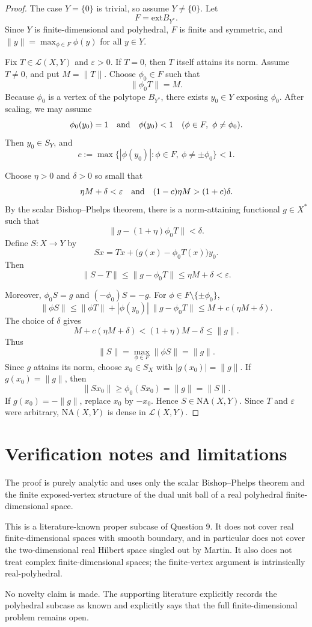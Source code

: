 \documentclass[11pt]{article}
\newcommand{\NA}{\mathrm{NA}}
\newcommand{\Lop}{\mathcal L}
\newcommand{\ext}{\mathrm{ext}}
\begin{document}
\begin{proof}
The case \(Y=\{0\}\) is trivial, so assume \(Y\ne \{0\}\).  Let
\[
  F=\ext B_{Y^*}.
\]
Since \(Y\) is finite-dimensional and polyhedral, \(F\) is finite and
symmetric, and \(\|y\|=\max_{\phi\in F}\phi(y)\) for all \(y\in Y\).

Fix \(T\in \Lop(X,Y)\) and \(\varepsilon>0\).  If \(T=0\), then \(T\) itself
attains its norm.  Assume \(T\ne 0\), and put \(M=\|T\|\).  Choose
\(\phi_0\in F\) such that
\[
  \|\phi_0 T\|=M.
\]
Because \(\phi_0\) is a vertex of the polytope \(B_{Y^*}\), there exists
\(y_0\in Y\) exposing \(\phi_0\).  After scaling, we may assume
\[
  \phi_0(y_0)=1
  \quad\hbox{and}\quad
  \phi(y_0)<1 \quad (\phi\in F,\ \phi\ne \phi_0).
\]
Then \(y_0\in S_Y\), and
\[
  c:=\max\{|\phi(y_0)|:\phi\in F,\ \phi\ne \pm\phi_0\}<1.
\]

Choose \(\eta>0\) and \(\delta>0\) so small that
\[
  \eta M+\delta<\varepsilon
  \quad\hbox{and}\quad
  (1-c)\eta M>(1+c)\delta .
\]
By the scalar Bishop--Phelps theorem, there is a norm-attaining functional
\(g\in X^*\) such that
\[
  \|g-(1+\eta)\phi_0T\|<\delta .
\]
Define \(S:X\to Y\) by
\[
  Sx=Tx+\bigl(g(x)-\phi_0T(x)\bigr)y_0.
\]
Then
\[
  \|S-T\|\le \|g-\phi_0T\|
  \le \eta M+\delta<\varepsilon.
\]

Moreover, \(\phi_0S=g\) and \((-\phi_0)S=-g\).  For
\(\phi\in F\setminus\{\pm\phi_0\}\),
\[
  \|\phi S\|
  \le \|\phi T\|+|\phi(y_0)|\,\|g-\phi_0T\|
  \le M+c(\eta M+\delta).
\]
The choice of \(\delta\) gives
\[
  M+c(\eta M+\delta)<(1+\eta)M-\delta\le \|g\|.
\]
Thus
\[
  \|S\|=\max_{\phi\in F}\|\phi S\|=\|g\|.
\]
Since \(g\) attains its norm, choose \(x_0\in S_X\) with
\(|g(x_0)|=\|g\|\).  If \(g(x_0)=\|g\|\), then
\[
  \|Sx_0\|\ge \phi_0(Sx_0)=\|g\|=\|S\|.
\]
If \(g(x_0)=-\|g\|\), replace \(x_0\) by \(-x_0\).  Hence \(S\in\NA(X,Y)\).
Since \(T\) and \(\varepsilon\) were arbitrary, \(\NA(X,Y)\) is dense in
\(\Lop(X,Y)\).
\end{proof}

\section*{Verification notes and limitations}

The proof is purely analytic and uses only the scalar Bishop--Phelps theorem
and the finite exposed-vertex structure of the dual unit ball of a real
polyhedral finite-dimensional space.

This is a literature-known proper subcase of Question 9.  It does not cover real
finite-dimensional spaces with smooth boundary, and in particular does not
cover the two-dimensional real Hilbert space singled out by Martin.  It also
does not treat complex finite-dimensional spaces; the finite-vertex argument is
intrinsically real-polyhedral.

No novelty claim is made.  The supporting literature explicitly records the
polyhedral subcase as known and explicitly says that the full finite-dimensional
problem remains open.
\end{document}

